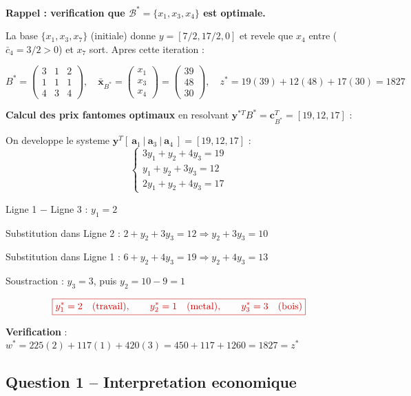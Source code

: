 \documentclass[12pt,a4paper]{article}
\begin{document}
\begin{correction}
\textbf{Rappel : verification que $\mathcal{B}^* = \{x_1, x_3, x_4\}$ est optimale.}

La base $\{x_1, x_3, x_7\}$ (initiale) donne $y = [7/2, 17/2, 0]$ et revele que $x_4$ entre ($\bar{c}_4 = 3/2 > 0$) et $x_7$ sort. Apres cette iteration :

$$B^* = \begin{pmatrix}3 & 1 & 2\\1 & 1 & 1\\4 & 3 & 4\end{pmatrix}, \quad \bar{\mathbf{x}}_{B^*} = \begin{pmatrix}x_1\\x_3\\x_4\end{pmatrix} = \begin{pmatrix}39\\48\\30\end{pmatrix}, \quad z^* = 19(39)+12(48)+17(30) = 1827$$

\textbf{Calcul des prix fantomes optimaux} en resolvant $\mathbf{y}^{*T} B^* = \mathbf{c}_{B^*}^T = [19, 12, 17]$ :

On developpe le systeme $\mathbf{y}^T [\ \mathbf{a}_1\ |\ \mathbf{a}_3\ |\ \mathbf{a}_4\ ] = [19,12,17]$ :
$$\begin{cases}
3y_1 + y_2 + 4y_3 = 19\\
y_1 + y_2 + 3y_3 = 12\\
2y_1 + y_2 + 4y_3 = 17
\end{cases}$$

Ligne 1 $-$ Ligne 3 : $y_1 = 2$

Substitution dans Ligne 2 : $2 + y_2 + 3y_3 = 12 \Rightarrow y_2 + 3y_3 = 10$

Substitution dans Ligne 1 : $6 + y_2 + 4y_3 = 19 \Rightarrow y_2 + 4y_3 = 13$

Soustraction : $y_3 = 3$, puis $y_2 = 10 - 9 = 1$

$$\textcolor{importantrouge}{\boxed{y_1^* = 2 \quad (\text{travail}), \qquad y_2^* = 1 \quad (\text{metal}), \qquad y_3^* = 3 \quad (\text{bois})}}$$

\textbf{Verification} : $w^* = 225(2) + 117(1) + 420(3) = 450 + 117 + 1260 = 1827 = z^*$ \checkmark
\end{correction}

\subsection{Question 1 -- Interpretation economique}
\end{document}
